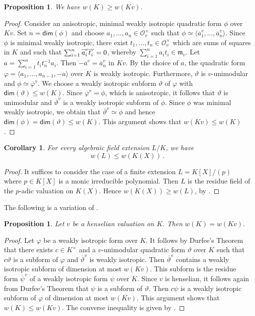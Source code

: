 \documentclass[twoside,11pt]{amsart}
\numberwithin{equation}{section}
\newtheorem{prop}[equation]{Proposition}
\newtheorem{cor}[equation]{Corollary}
\theoremstyle{definition}
\renewcommand{\dim}{\operatorname{\mathsf{dim}}}
\newcommand{\vf}{\varphi}
\newcommand{\mg}[1]{{#1}^{\times}}
\newcommand{\la}{\langle}
\newcommand{\ra}{\rangle}
\renewcommand{\leq}{\leqslant}
\renewcommand{\geq}{\geqslant}
\newcommand{\mc}{\mathcal}
\newcommand{\ovl}{\overline}
\renewcommand{\dim}{\mathsf{dim}}
\renewcommand{\leq}{\leqslant}
\renewcommand{\geq}{\geqslant}
\newcommand{\mf}{\mathfrak}
\newcommand{\mfm}{\mf{m}}
\begin{document}
\begin{prop}\label{w-val-inequality}
We have $w(K)\geq w(Kv)$. 
 \end{prop}
\begin{proof}  
Consider an anisotropic, minimal weakly isotropic quadratic form $\phi$  over $Kv$. 
Set $n=\dim(\phi)$ and choose $a_1,\dots,a_n\in\mg{\mc{O}}_v$ such that 
$\phi\simeq \la \ovl{a}_1^{v},\dots,\ovl{a}_n^{v}\ra$.
Since $\phi$ is minimal weakly isotropic, there exist $t_1,\dots,t_n\in\mg{\mc{O}}_v$ which are sums of squares in $K$ and such that $\sum_{i=1}^n \ovl{\vphantom{t}a}^v_i \ovl{t}^v_i=0$,
whereby $\sum_{i=1}^n a_it_i\in\mfm_v$.
Let $a=\sum_{i=1}^nt_it_n^{-1}a_i$.
Then $-\ovl{a}^{v}=\ovl{a}_n^{v}$ in $Kv$.
By the choice of $a$, the quadratic form $\varphi=\la a_1,\dots,a_{n-1},-a\ra$ over $K$ is weakly isotropic.
Furthermore, $\vartheta$ is $v$-unimodular and $\phi\simeq \ovl{\vf}^v$.
We choose a weakly isotropic subform $\vartheta$ of $\vf$ with $\dim(\vartheta)\leq w(K)$.
Since $\ovl{\vf}^v=\phi$, which is anisotropic, it follows that $\vartheta$ is unimodular and $\ovl{\vartheta}^v$ is a weakly isotropic subform of $\phi$.
Since $\phi$ was minimal weakly isotropic, we obtain that $\ovl{\vartheta}^v\simeq \phi$ and hence $\dim(\phi)=\dim(\vartheta)\leq w(K)$.
This argument shows that $w(Kv)\leq w(K)$.
\end{proof}

 \begin{cor}\label{alg-rafufi-w-inequality}
  For every algebraic field extension $L/K$, we have 
   $$w(L)\leq w(K(X))\,.$$
\end{cor}
\begin{proof}
    It suffices to consider the case of a finite extension $L=K[X]/(p)$ where $p\in K[X]$ is a monic irreducible polynomial. 
    Then $L$ is the residue field of the $p$-adic valuation on $K(X)$.
    Hence $w(K(X))\geq w(L)$, by  .
\end{proof}

The following is a variation of \cite[Prop.~5.5]{Bec06}.

\begin{prop}\label{hens-w-equal}
    Let $v$ be a henselian valuation on $K$.
    Then $w(K)=w(Kv)$.
\end{prop}
\begin{proof}
    Let $\vf$ be a weakly isotropic form over $K$. 
    It follows by Durfee's Theorem \cite[Theorem 3.11]{BDM25} that there exists $c\in\mg{K}$ and a $v$-unimodular quadratic form $\vartheta$ over $K$ such that $c\vartheta$ is a subform of $\vf$ and $\ovl{\vartheta}^v$ is weakly isotropic.
    Then $\ovl{\vartheta}^v$ contains a weakly isotropic subform of dimension at most $w(Kv)$. This subform is the residue form $\ovl{\psi}^v$ of a weakly isotropic form $\psi$ over $K$.
    Since $v$ is henselian, it follows again from Durfee's Theorem that $\psi$ is a subform of $\vartheta$.
    Then $c\psi$ is a weakly isotropic subform of $\vf$ of dimension at most $w(Kv)$. 
    This argument shows that $w(K)\leq w(Kv)$.
    The converse inequality is given by .
\end{proof}
\end{document}
